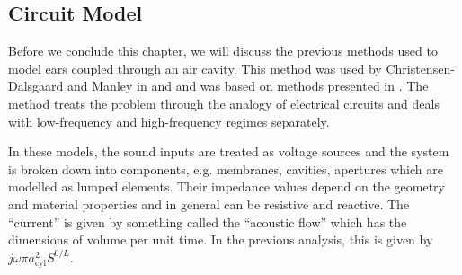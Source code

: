 \subsection{Circuit Model}
Before we conclude this chapter, we will discuss the previous methods used to model ears coupled through
an air cavity. This method was used by Christensen-Dalsgaard and Manley in \cite{dalsgaardmanley1} and \cite{dalsgaardmanley2}
and was based on methods presented in \cite{fletcheracoustic}. The method treats the problem through the analogy of electrical circuits
and deals with low-frequency and high-frequency regimes separately.

In these models, the sound inputs are treated as voltage sources and the system is broken down into components, e.g.	 membranes,
cavities, apertures which are modelled as lumped elements. Their impedance values depend on the geometry and material properties and in general
 can be resistive and reactive. The ``current'' is given by something called the ``acoustic flow'' which has the dimensions of
volume per unit time. In the previous analysis, this is given by $j\omega\pi a^2_{\mathrm{cyl}}S^{0/L}$. 

